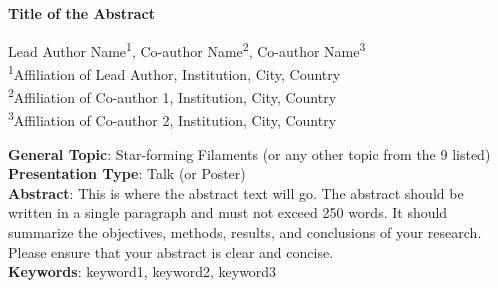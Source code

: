 \documentclass[a4paper,11pt]{article}
\begin{document}
\begin{center}
    {\Large \bfseries Title of the Abstract} \\[15pt]
\end{center}

\begin{center}
    Lead Author Name\textsuperscript{1}, Co-author Name\textsuperscript{2}, Co-author Name\textsuperscript{3} \\[10pt]
    \textsuperscript{1}Affiliation of Lead Author, Institution, City, Country \\ 
    \textsuperscript{2}Affiliation of Co-author 1, Institution, City, Country \\
    \textsuperscript{3}Affiliation of Co-author 2, Institution, City, Country \\[15pt]
\end{center}

\noindent \textbf{General Topic}: Star-forming Filaments (or any other topic from the 9 listed) \\[5pt]

\noindent \textbf{Presentation Type}: Talk (or Poster) \\[10pt]

\noindent \textbf{Abstract}: This is where the abstract text will go. The abstract should be written in a single paragraph and must not exceed 250 words. It should summarize the objectives, methods, results, and conclusions of your research. Please ensure that your abstract is clear and concise. \\[10pt]

\noindent \textbf{Keywords}: keyword1, keyword2, keyword3 \\[10pt]
\end{document}
